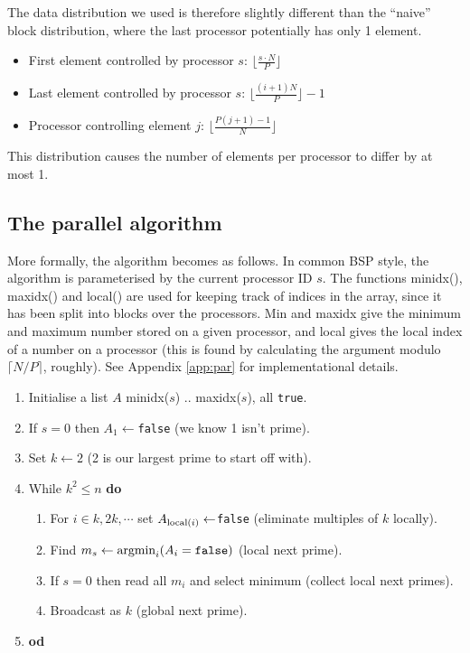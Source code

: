 \documentclass[a4paper]{article}
\begin{document}
The data distribution we used is therefore slightly different than the ``naive''
block distribution, where the last processor potentially has only 1 element. 

\begin{itemize}
    \item First element controlled by processor $s$: $\lfloor \frac{s\cdot
        N}{P} \rfloor$
    \item Last element controlled by processor $s$: $\lfloor
        \frac{(i+1)N}{P} \rfloor -1$
    \item Processor controlling element $j$: $\lfloor \frac{P(j+1) -1}{N} \rfloor$
\end{itemize}

This distribution causes the number of elements per processor to differ by at
most 1. 

\subsection{The parallel algorithm}\label{sec:paralg}

More formally, the algorithm becomes as follows. In common BSP style, the
algorithm is parameterised by the current processor ID $s$. The functions
minidx(), maxidx() and local() are used for keeping track of indices in the
array, since it has been split into blocks over the processors. Min and maxidx
give the minimum and maximum number stored on a given processor, and local gives
the local index of a number on a processor (this is found by calculating the
argument modulo $\lceil N/P \rceil$, roughly). See Appendix \ref{app:par} for
implementational details. 

\begin{enumerate}
    \item Initialise a list $A$ minidx($s$) .. maxidx($s$), all \texttt{true}.
    \item If $s=0$ then $A_1 \leftarrow $\texttt{false} (we know 1 isn't prime).
    \item Set $k\leftarrow 2$ (2 is our largest prime to start off with).
    \item While $k^2 \le n$ \textbf{do}
        \begin{enumerate}
            \item For $i \in {k, 2 k, \cdots }$ set $A_{\textnormal{local}(i)} \leftarrow
                $\texttt{false} (eliminate multiples of $k$ locally).
            \item Find $m_s \leftarrow \displaystyle \textnormal{argmin}_{i}
                (A_i = \texttt{false})$ (local next prime).
            \item If $s=0$ then read all $m_i$ and select minimum (collect local
                next primes).
            \item Broadcast as $k$ (global next prime).
        \end{enumerate}
    \item \textbf{od}
\end{enumerate}
\end{document}
